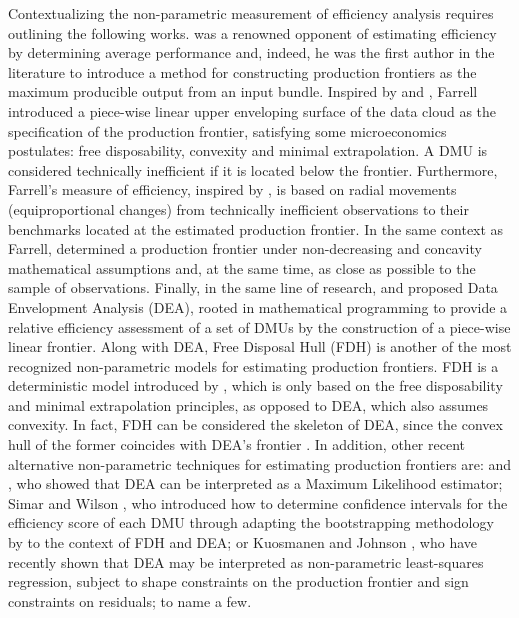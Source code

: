 Contextualizing the non-parametric measurement of efficiency analysis
requires outlining the following works. \citet{farrel1957} was a
renowned opponent of estimating efficiency by determining average
performance and, indeed, he was the first author in the literature to
introduce a method for constructing production frontiers as the maximum
producible output from an input bundle. Inspired by \citet{koopmans1951}
and \citet{debreu1951}, Farrell introduced a piece-wise linear upper
enveloping surface of the data cloud as the specification of the
production frontier, satisfying some microeconomics postulates: free
disposability, convexity and minimal extrapolation. A DMU is considered
technically inefficient if it is located below the frontier.
Furthermore, Farrell's measure of efficiency, inspired by
\citet{shephard1953}, is based on radial movements (equiproportional
changes) from technically inefficient observations to their benchmarks
located at the estimated production frontier. In the same context as
Farrell, \citet{afriat1972} determined a production frontier under
non-decreasing and concavity mathematical assumptions and, at the same
time, as close as possible to the sample of observations. Finally, in
the same line of research, \citet{charnes1978} and \citet{banker1984}
proposed Data Envelopment Analysis (DEA), rooted in mathematical
programming to provide a relative efficiency assessment of a set of DMUs
by the construction of a piece-wise linear frontier. Along with DEA,
Free Disposal Hull (FDH) is another of the most recognized
non-parametric models for estimating production frontiers. FDH is a
deterministic model introduced by \citet{deprins1984}, which is only
based on the free disposability and minimal extrapolation principles, as
opposed to DEA, which also assumes convexity. In fact, FDH can be
considered the skeleton of DEA, since the convex hull of the former
coincides with DEA's frontier \citep[see][]{daraio2005}. In addition,
other recent alternative non-parametric techniques for estimating
production frontiers are: \citet{banker1992} and \citet{banker1993}, who
showed that DEA can be interpreted as a Maximum Likelihood estimator;
Simar and Wilson
\citetext{\citeyear{simar1998}; \citeyear{simar2000a}; \citeyear{simar2000b}},
who introduced how to determine confidence intervals for the efficiency
score of each DMU through adapting the bootstrapping methodology by
\citet{effron1979} to the context of FDH and DEA; or Kuosmanen and
Johnson \citetext{\citeyear{kuosmanen2010}; \citeyear{kuosmanen2017}},
who have recently shown that DEA may be interpreted as non-parametric
least-squares regression, subject to shape constraints on the production
frontier and sign constraints on residuals; to name a few.

